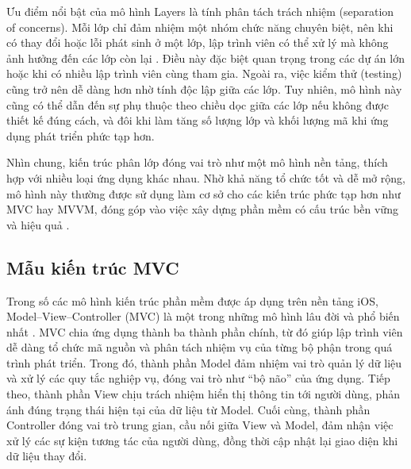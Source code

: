     \begin{flushleft}
        \hspace*{0.8cm}Ưu điểm nổi bật của mô hình Layers là tính phân tách trách nhiệm (separation of concerns). Mỗi lớp chỉ đảm nhiệm một nhóm chức năng chuyên biệt, nên khi có thay đổi hoặc lỗi phát sinh ở một lớp, lập trình viên có thể xử lý mà không ảnh hưởng đến các lớp còn lại \cite{separation}. Điều này đặc biệt quan trọng trong các dự án lớn hoặc khi có nhiều lập trình viên cùng tham gia. Ngoài ra, việc kiểm thử (testing) cũng trở nên dễ dàng hơn nhờ tính độc lập giữa các lớp. Tuy nhiên, mô hình này cũng có thể dẫn đến sự phụ thuộc theo chiều dọc giữa các lớp nếu không được thiết kế đúng cách, và đôi khi làm tăng số lượng lớp và khối lượng mã khi ứng dụng phát triển phức tạp hơn.
    \end{flushleft}
    
    \begin{flushleft}
        \hspace*{0.8cm}Nhìn chung, kiến trúc phân lớp đóng vai trò như một mô hình nền tảng, thích hợp với nhiều loại ứng dụng khác nhau. Nhờ khả năng tổ chức tốt và dễ mở rộng, mô hình này thường được sử dụng làm cơ sở cho các kiến trúc phức tạp hơn như MVC hay MVVM, đóng góp vào việc xây dựng phần mềm có cấu trúc bền vững và hiệu quả \cite{mvvm_mvc_foundation}.
    \end{flushleft}

\subsection{Mẫu kiến trúc MVC}
\renewcommand{\labelitemi}{--}    
    \begin{flushleft}
        \hspace*{0.8cm}Trong số các mô hình kiến trúc phần mềm được áp dụng trên nền tảng iOS, Model–View–Controller (MVC) là một trong những mô hình lâu đời và phổ biến nhất \cite{mvc_origins}. MVC chia ứng dụng thành ba thành phần chính, từ đó giúp lập trình viên dễ dàng tổ chức mã nguồn và phân tách nhiệm vụ của từng bộ phận trong quá trình phát triển. Trong đó, thành phần Model đảm nhiệm vai trò quản lý dữ liệu và xử lý các quy tắc nghiệp vụ, đóng vai trò như “bộ não” của ứng dụng. Tiếp theo, thành phần View chịu trách nhiệm hiển thị thông tin tới người dùng, phản ánh đúng trạng thái hiện tại của dữ liệu từ Model. Cuối cùng, thành phần Controller đóng vai trò trung gian, cầu nối giữa View và Model, đảm nhận việc xử lý các sự kiện tương tác của người dùng, đồng thời cập nhật lại giao diện khi dữ liệu thay đổi.
    \end{flushleft}

